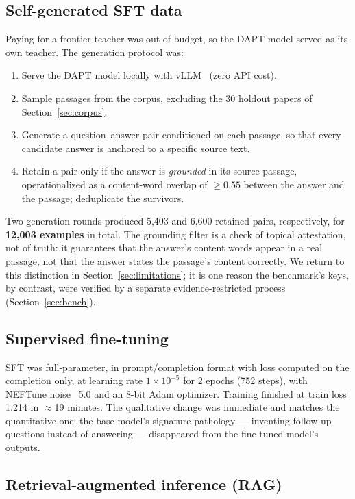 \documentclass[11pt]{article}
\begin{document}
\subsection{Self-generated SFT data}
\label{sec:sft-data}

Paying for a frontier teacher was out of budget, so the DAPT model served
as its own teacher. The generation protocol was:
\begin{enumerate}
\item Serve the DAPT model locally with vLLM~\cite{vllm} (zero API cost).
\item Sample passages from the corpus, excluding the 30 holdout papers of
Section~\ref{sec:corpus}.
\item Generate a question--answer pair conditioned on each passage, so
that every candidate answer is anchored to a specific source text.
\item Retain a pair only if the answer is \emph{grounded} in its source
passage, operationalized as a content-word overlap of $\geq 0.55$ between
the answer and the passage; deduplicate the survivors.
\end{enumerate}
Two generation rounds produced 5,403 and 6,600 retained pairs,
respectively, for \textbf{12,003 examples} in total. The grounding filter
is a check of topical attestation, not of truth: it guarantees that the
answer's content words appear in a real passage, not that the answer
states the passage's content correctly. We return to this distinction in
Section~\ref{sec:limitations}; it is one reason the benchmark's keys, by
contrast, were verified by a separate evidence-restricted process
(Section~\ref{sec:bench}).

\subsection{Supervised fine-tuning}
\label{sec:sft-train}

SFT was full-parameter, in prompt/completion format with loss computed on
the completion only, at learning rate $1\times10^{-5}$ for 2 epochs
(752 steps), with NEFTune noise~\cite{neftune} 5.0 and an 8-bit Adam
optimizer. Training finished at train loss 1.214 in $\approx$19 minutes. The
qualitative change was immediate and matches the quantitative one: the
base model's signature pathology --- inventing follow-up questions instead
of answering --- disappeared from the fine-tuned model's outputs.

\subsection{Retrieval-augmented inference (RAG)}
\label{sec:rag}
\end{document}
